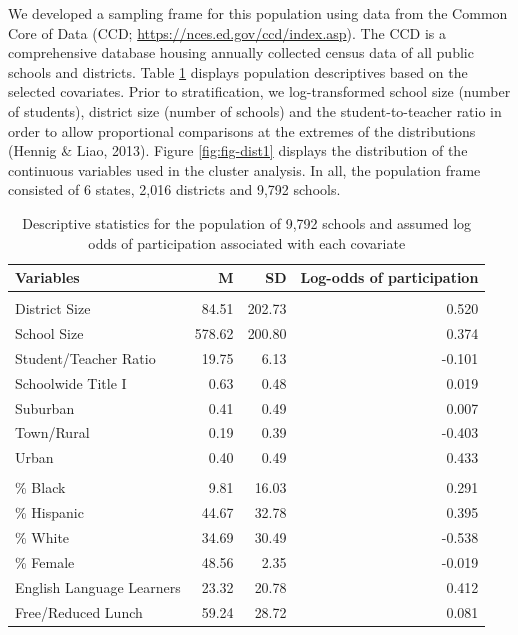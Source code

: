 \documentclass[
  man,floatsintext]{apa6}
\begin{document}
We developed a sampling frame for this population using data from the Common Core of Data (CCD; \url{https://nces.ed.gov/ccd/index.asp}). The CCD is a comprehensive database housing annually collected census data of all public schools and districts. Table \ref{tab:tab-RGM-Pars} displays population descriptives based on the selected covariates. Prior to stratification, we log-transformed school size (number of students), district size (number of schools) and the student-to-teacher ratio in order to allow proportional comparisons at the extremes of the distributions (Hennig \& Liao, 2013). Figure \ref{fig:fig-dist1} displays the distribution of the continuous variables used in the cluster analysis. In all, the population frame consisted of 6 states, 2,016 districts and 9,792 schools.

\begin{table}[!h]

\caption{\label{tab:tab-RGM-Pars}Descriptive statistics for the population of 9,792 schools and assumed log odds of participation associated with each covariate}
\centering
\begin{tabular}[t]{lrrr}
\toprule
Variables & M & SD & Log-odds of participation\\
\midrule
\addlinespace[0.3em]
\multicolumn{4}{l}{\textbf{School Data}}\\
\hspace{1em}District Size & 84.51 & 202.73 & 0.520\\
\hspace{1em}School Size & 578.62 & 200.80 & 0.374\\
\hspace{1em}Student/Teacher Ratio & 19.75 & 6.13 & -0.101\\
\hspace{1em}Schoolwide Title I & 0.63 & 0.48 & 0.019\\
\hspace{1em}Suburban & 0.41 & 0.49 & 0.007\\
\hspace{1em}Town/Rural & 0.19 & 0.39 & -0.403\\
\hspace{1em}Urban & 0.40 & 0.49 & 0.433\\
\addlinespace[0.3em]
\multicolumn{4}{l}{\textbf{Student Data}}\\
\hspace{1em}\% Black & 9.81 & 16.03 & 0.291\\
\hspace{1em}\% Hispanic & 44.67 & 32.78 & 0.395\\
\hspace{1em}\% White & 34.69 & 30.49 & -0.538\\
\hspace{1em}\% Female & 48.56 & 2.35 & -0.019\\
\hspace{1em}English Language Learners & 23.32 & 20.78 & 0.412\\
\hspace{1em}Free/Reduced Lunch & 59.24 & 28.72 & 0.081\\
\bottomrule
\end{tabular}
\end{table}
\end{document}
